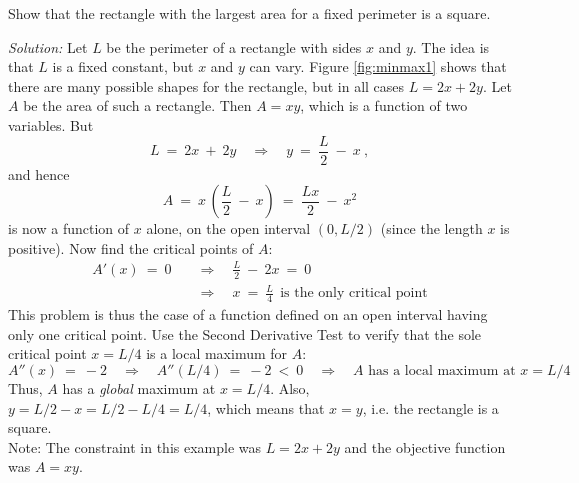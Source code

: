 \begin{exmp}\label{exmp:minmax1}
 \piccaption[]{\label{fig:minmax1}}
\noindent Show that the rectangle with the largest area for a fixed perimeter is
 a square.\vspace{1mm}
\par\noindent\emph{Solution:} Let $L$ be the perimeter of a rectangle with sides
$x$ and $y$. The idea is that $L$ is a fixed constant, but $x$ and $y$ can vary.
Figure \ref{fig:minmax1} shows that there are many possible shapes
for the rectangle, but in all cases $L = 2x + 2y$. Let $A$ be the area of such a
rectangle. Then $A = xy$, which is a function of two variables. But
\[
L ~=~ 2x ~+~ 2y \quad\Rightarrow\quad y ~=~ \frac{L}{2} ~-~ x ~,
\]
and hence
\[
A ~=~ x\,\left(\frac{L}{2} ~-~ x\right) ~=~ \frac{Lx}{2} ~-~ x^2
\]
is now a function of $x$ alone, on the open interval $(0,L/2)$ (since the length
$x$ is positive). Now find the critical points of $A$:
\begin{align*}
A'(x) ~=~ 0 \quad&\Rightarrow\quad \frac{L}{2} ~-~ 2x ~=~ 0\\
&\Rightarrow\quad x ~=~ \frac{L}{4} ~~\text{is the only critical point}
\end{align*}
This problem is thus the case of a function defined on an open interval having
only one critical point. Use the Second Derivative Test to verify that the sole
critical point $x=L/4$ is a local maximum for $A$:
\[
A''(x) ~=~ -2 \quad\Rightarrow\quad A''(L/4) ~=~ -2 ~<~ 0
\quad\Rightarrow\quad\text{$A$ has a local maximum at $x = L/4$}
\]
Thus, $A$ has a \emph{global} maximum at $x=L/4$. Also, $y = L/2 - x = L/2 - L/4
= L/4$, which means that $x = y$, i.e. the rectangle is a square.\\Note: The
constraint in this example was $L=2x+2y$ and the objective function was $A=xy$.
\end{exmp}
